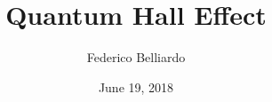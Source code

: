 \documentclass{beamer}
\title[Quantum Hall Effect]{Quantum Hall Effect} %
\author[Federico Belliardo]
{
Federico Belliardo \\
}
\institute[SNS] %
{
Dipartimento di Fisica\\ %
Università di Pisa \\
\medskip
}
\date{June 19, 2018} %
\begin{document}
\begin{frame}
\titlepage %
\end{frame}


\end{document}
